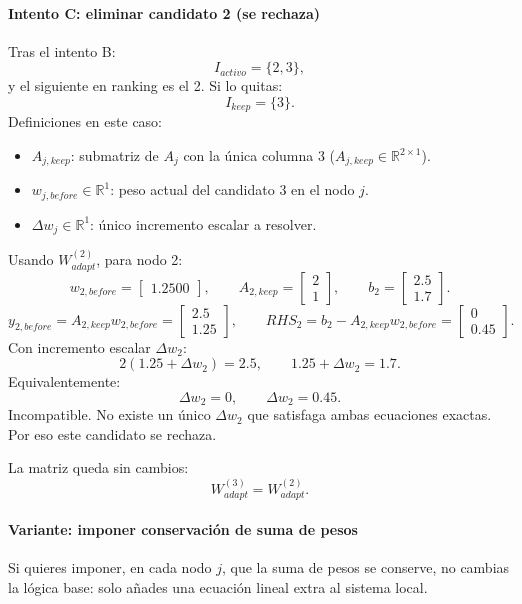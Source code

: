 \documentclass[11pt,a4paper]{article}
\begin{document}
\paragraph{Intento C: eliminar candidato 2 (se rechaza)}
Tras el intento B:
\[
I_{activo}=\{2,3\},
\]
y el siguiente en ranking es el 2. Si lo quitas:
\[
I_{keep}=\{3\}.
\]
Definiciones en este caso:
\begin{itemize}[leftmargin=1.5em]
\item $A_{j,keep}$: submatriz de $A_j$ con la única columna 3
($A_{j,keep}\in\mathbb{R}^{2\times 1}$).
\item $w_{j,before}\in\mathbb{R}^{1}$: peso actual del candidato 3 en el nodo $j$.
\item $\Delta w_j\in\mathbb{R}^{1}$: único incremento escalar a resolver.
\end{itemize}

Usando $W_{adapt}^{(2)}$, para nodo 2:
\[
w_{2,before}=
\begin{bmatrix}
1.2500
\end{bmatrix},
\qquad
A_{2,keep}=
\begin{bmatrix}
2\\1
\end{bmatrix},
\qquad
b_2=
\begin{bmatrix}
2.5\\1.7
\end{bmatrix}.
\]
\[
y_{2,before}=A_{2,keep}w_{2,before}
=
\begin{bmatrix}
2.5\\1.25
\end{bmatrix},
\qquad
RHS_2=
b_2-A_{2,keep}w_{2,before}
=
\begin{bmatrix}
0\\0.45
\end{bmatrix}.
\]
Con incremento escalar $\Delta w_2$:
\[
2(1.25+\Delta w_2)=2.5,\qquad
1.25+\Delta w_2=1.7.
\]
Equivalentemente:
\[
\Delta w_2=0,\qquad
\Delta w_2=0.45.
\]
Incompatible. No existe un único $\Delta w_2$ que satisfaga ambas ecuaciones exactas.
Por eso este candidato se rechaza.

La matriz queda sin cambios:
\[
W_{adapt}^{(3)}=W_{adapt}^{(2)}.
\]

\paragraph{Variante: imponer conservación de suma de pesos}
Si quieres imponer, en cada nodo $j$, que la suma de pesos se conserve, no cambias
la lógica base: solo añades una ecuación lineal extra al sistema local.
\end{document}
